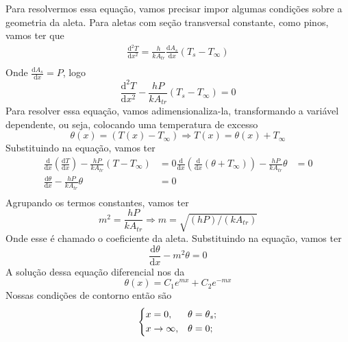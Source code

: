 Para resolvermos essa equação, vamos precisar impor algumas condições sobre a geometria da aleta.
Para aletas com seção transversal constante, como pinos, vamos ter que
\begin{align}
    \frac{\mathrm{d}^{2} T}{\mathrm{d}x^{2} } = \frac{h}{k A_{tr}} \frac{\mathrm{d}A_s}{\mathrm{d}x} \left(T_s - T_\infty \right)\\
\end{align}
Onde \(\frac{\mathrm{d}A_{s} }{\mathrm{d}x}  = P\), logo
\begin{equation}
    \frac{\mathrm{d}^{2} T}{\mathrm{d}x^{2} } - \frac{h P}{k A_{tr}} \left(T_s - T_\infty \right) = 0
\end{equation}
Para resolver essa equação, vamos adimensionaliza-la, transformando a variável dependente, ou seja,
colocando uma temperatura de excesso
\begin{equation}
    \theta (x) = \left( T(x) - T_\infty  \right) \Rightarrow  T(x) = \theta (x) + T_\infty
\end{equation}
Substituindo na equação, vamos ter
\begin{align}
    \frac{\mathrm{d}}{\mathrm{d}x} \left( \frac{\mathrm{d}T}{\mathrm{d}x}  \right) - \frac{hP}{kA_{tr}}\left( T - T_\infty  \right) &= 0
    \frac{\mathrm{d}}{\mathrm{d}x} \left( \frac{\mathrm{d}}{\mathrm{d}x} \left( \theta + T_\infty  \right)  \right) - \frac{hP}{kA_{tr}}\theta &= 0\\
    \frac{\mathrm{d}\theta }{\mathrm{d}x}  - \frac{hP}{kA_{tr}}\theta &= 0\\
\end{align}
Agrupando os termos constantes, vamos ter 
\begin{equation}
    m^{2} = \frac{hP}{kA_{tr}} \Rightarrow m = \sqrt{(hP)/(kA_{tr})} 
\end{equation}
Onde esse é chamado o coeficiente da aleta. Substituindo na equação, vamos ter
\begin{equation}
    \frac{\mathrm{d}\theta }{\mathrm{d}x}  - m^{2}\theta = 0
\end{equation}
A solução dessa equação diferencial nos da
\begin{equation}
    \theta (x) = C_1 e^{mx} + C_2 e^{-mx}
\end{equation}
Nossas condições de contorno então são
\begin{align}
\begin{dcases}
    x = 0, & \theta = \theta_s ;\\
    x \to \infty , & \theta = 0 ;\\
\end{dcases}
\end{align}
